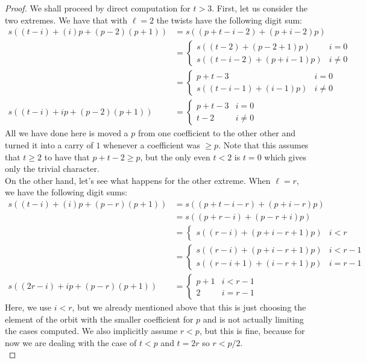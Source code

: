 \begin{proof}
We shall proceed by direct computation for $t > 3$.
First, let us consider the two extremes. 
We have that with $\ell = 2$ the twists have the following digit sum:
\begin{align*}
 s((t-i) + (i)p + (p - 2)(p+1)) &= s((p + t - i - 2) + (p + i -2)p) \\ 
 &= \begin{cases}
   s((t-2) + (p-2+1)p) & i = 0 \\
   s((t-i-2) + (p+i-1)p)& i \neq 0
 \end{cases} \\
 &= \begin{cases}
   p+t - 3 & i = 0 \\
   s((t-i-1)+(i-1)p) & i \neq 0
 \end{cases} \\
 s((t-i) + ip + (p - 2)(p+1)) &= \begin{cases}
   p+t - 3 & i = 0 \\
   t-2 & i \neq 0
 \end{cases}
\end{align*}
All we have done here is moved a $p$ from one coefficient to the other other and turned it into a carry of $1$ whenever a coefficient was $\geq p$. 
Note that this assumes that $t \geq 2$ to have that $p+t-2 \geq p$, but the only even $t < 2$ is $t =0$ which gives only the trivial character.
\\

On the other hand, let's see what happens for the other extreme. 
When $\ell = r$, we have the following digit sums:
\begin{align*}
 s((t-i) + (i)p + (p - r)(p+1)) &= s((p + t- i - r) +(p + i -r) p) \\ 
 &=s((p + r - i) + (p -r + i)p) \\
 &= \begin{cases}
s((r-i) + (p+i-r+1)p) & i < r
 \end{cases} \\
 &= \begin{cases}
s((r-i) + (p+i-r+1)p) & i < r-1 \\
 s((r-i+1) + (i-r+1)p) & i = r-1
 \end{cases} \\
  s((2r-i) + ip + (p - r)(p+1)) &= \begin{cases}
p+1 & i < r-1 \\
2 & i = r-1
 \end{cases}
\end{align*}
Here, we use $i < r$, but we already mentioned above that this is just choosing the element of the orbit with the smaller coefficient for $p$ and is not actually limiting the cases computed. 
We also implicitly assume $r < p$, but this is fine, because for now we are dealing with the case of $t < p$ and $t = 2r$ so $ r < p/2$.
\\


\end{proof}
